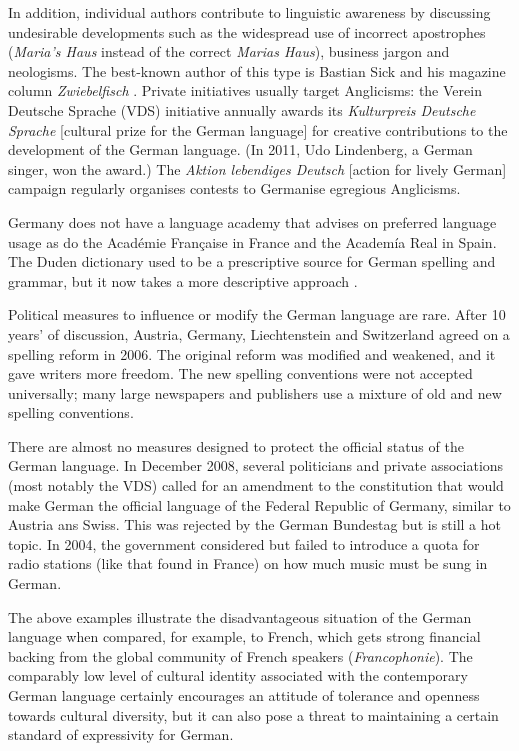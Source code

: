\documentclass[]{../../metanetpaper}
\begin{document}
\begin{multicols}{2}
In addition, individual authors contribute to linguistic awareness by discussing undesirable developments such as the widespread use of incorrect apostrophes (\textit{Maria’s Haus} instead of the correct \textit{Marias Haus}), business jargon and neologisms. The best-known author of this type is Bastian Sick \cite{Sick1} and his magazine column \textit{Zwiebelfisch} \cite{Sick2}. Private initiatives usually target Anglicisms: the Verein Deutsche Sprache (VDS) initiative annually awards its \textit{Kulturpreis Deutsche Sprache} [cultural prize for the German language] for creative contributions to the development of the German language. (In 2011, Udo Lindenberg, a German singer, won the award.) The \textit{Aktion lebendiges Deutsch} [action for lively German] campaign regularly organises contests to Germanise egregious Anglicisms.

Germany does not have a language academy that advises on preferred language usage as do the Académie Française in France and the Academía Real in Spain. The Duden dictionary used to be a prescriptive source for German spelling and grammar, but it now takes a more descriptive approach \cite{Schn1}. 

Political measures to influence or modify the German language are rare. After 10 years’ of discussion, Austria, Germany, Liechtenstein and Switzerland agreed on a spelling reform in 2006. The original reform was modified and weakened, and it gave writers more freedom. The new spelling conventions were not accepted universally; many large newspapers and publishers use a mixture of old and new spelling conventions.


There are almost no measures designed to protect the official status of the German language. In December 2008, several politicians and private associations (most notably the VDS) called for an amendment to the constitution that would make German the official language of the Federal Republic of Germany, similar to Austria ans Swiss. This was rejected by the German Bundestag but is still a hot topic. In 2004, the government considered but failed to introduce a quota for radio stations (like that found in France) on how much music must be sung in German. 

The above examples illustrate the disadvantageous situation of the German language when compared, for example, to French, which gets strong financial backing from the global community of French speakers (\textit{Francophonie}). The comparably low level of cultural identity associated with the contemporary German language certainly encourages an attitude of tolerance and openness towards cultural diversity, but it can also pose a threat to maintaining a certain standard of expressivity for German.


\end{multicols}
\end{document}
